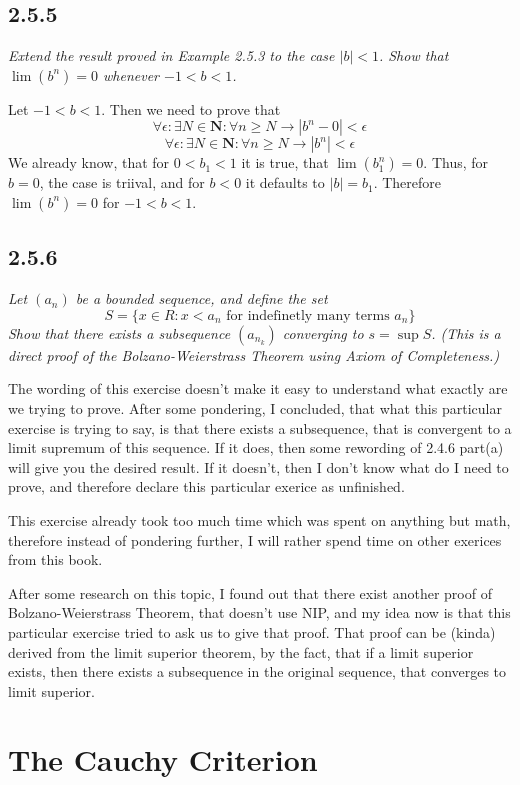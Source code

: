 \documentclass[11pt,oneside,titlepage]{book}
\begin{document}
\subsection*{2.5.5}
\textit{Extend the result proved in Example 2.5.3 to the case $|b| < 1$.
  Show that $\lim (b^n) = 0$ whenever $-1 < b < 1$.}

Let $-1 < b < 1$. Then we need to prove that
$$\forall \epsilon: \exists N \in \textbf{N}: \forall n \geq N \to
|b^n - 0| < \epsilon$$
$$\forall \epsilon: \exists N \in \textbf{N}: \forall n \geq N \to
|b^n| < \epsilon$$
We already know, that for $0 < b_1 < 1$ it is true, that $\lim (b_1^n) = 0$.
Thus, for $b = 0$, the case is triival, and for $b < 0$ it defaults to
$|b| = b_1$. Therefore $\lim (b^n) = 0$ for $-1 < b < 1$.

\subsection*{2.5.6}
\textit{Let $(a_n)$ be a bounded sequence, and define the set }
$$S = \{x \in R: x < a_n \text{ for indefinetly many terms }a_n \}$$
\textit{Show that there exists a subsequence $(a_{n_k})$ converging to
  $s = \sup S$. (This is a direct proof of the Bolzano-Weierstrass Theorem
  using Axiom of Completeness.) }

The wording of this exercise doesn't make it easy to understand what exactly
are we trying to prove. After some pondering, I concluded, that what this
particular exercise is trying to say, is that there exists a subsequence,
that is convergent to a limit supremum of this sequence. If it does, then
some rewording of 2.4.6 part(a) will give you the desired result. If it
doesn't, then I don't know what do I need to prove, and therefore
declare this particular exerice as unfinished.

This exercise already took too much time which was spent on anything but
math, therefore instead of pondering further, I will rather spend time on
other exerices from this book.

After some research on this topic, I found out that there exist another
proof of Bolzano-Weierstrass Theorem, that doesn't use NIP, and my idea
now is that this particular exercise tried to ask us to give that proof.
That proof can be (kinda) derived from the limit superior theorem, by
the fact, that if a limit superior exists, then there exists 
a subsequence in the original sequence, that converges to limit
superior.

\section{The Cauchy Criterion}
\end{document}
